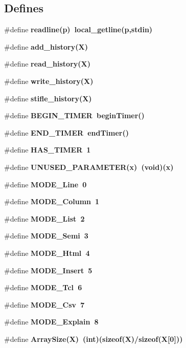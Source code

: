 \subsection*{Defines}
\begin{CompactItemize}
\item 
\#define \bf{readline}(p)~local\_\-getline(p,stdin)
\item 
\#define \bf{add\_\-history}(X)
\item 
\#define \bf{read\_\-history}(X)
\item 
\#define \bf{write\_\-history}(X)
\item 
\#define \bf{stifle\_\-history}(X)
\item 
\#define \bf{BEGIN\_\-TIMER}~begin\-Timer()
\item 
\#define \bf{END\_\-TIMER}~end\-Timer()
\item 
\#define \bf{HAS\_\-TIMER}~1
\item 
\#define \bf{UNUSED\_\-PARAMETER}(x)~(void)(x)
\item 
\#define \bf{MODE\_\-Line}~0
\item 
\#define \bf{MODE\_\-Column}~1
\item 
\#define \bf{MODE\_\-List}~2
\item 
\#define \bf{MODE\_\-Semi}~3
\item 
\#define \bf{MODE\_\-Html}~4
\item 
\#define \bf{MODE\_\-Insert}~5
\item 
\#define \bf{MODE\_\-Tcl}~6
\item 
\#define \bf{MODE\_\-Csv}~7
\item 
\#define \bf{MODE\_\-Explain}~8
\item 
\#define \bf{Array\-Size}(X)~(int)(sizeof(X)/sizeof(X[0]))
\end{CompactItemize}
